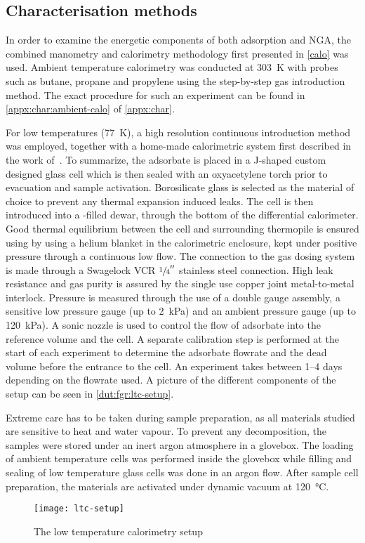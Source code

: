 \subsection{Characterisation methods}

In order to examine the energetic components of both adsorption and 
NGA, the combined manometry and calorimetry methodology first 
presented in \autoref{calo} was used. Ambient temperature calorimetry
was conducted at \SI{303}{\kelvin} with probes such as butane, propane
and propylene using the step-by-step gas introduction method. 
The exact procedure for such an experiment can be found in 
\autoref{appx:char:ambient-calo} of \autoref{appx:char}.

For low temperatures (\SI{77}{\kelvin}), a high resolution continuous
introduction method was employed, together with a home-made 
calorimetric system first described in the work 
of~\citet{rouquerolCalorimetricEvidenceBidimensional1977}. To summarize,
the adsorbate is placed in a J-shaped custom designed glass cell which is
then sealed with an oxyacetylene torch prior to evacuation and sample 
activation. Borosilicate glass is selected as
the material of choice to prevent any thermal expansion induced leaks.
The cell is then introduced into a -filled dewar, through 
the bottom of the differential calorimeter. Good thermal equilibrium
between the cell and surrounding thermopile is ensured using by 
using a helium blanket in the calorimetric enclosure, kept under 
positive pressure through a continuous low flow. The connection to the 
gas dosing system is made through a Swagelock VCR \(\sfrac{1}{4}''\)
stainless steel connection. High leak resistance and gas purity 
is assured by the single use copper joint metal-to-metal interlock.
Pressure is measured through the use of a double gauge assembly,
a sensitive low pressure gauge (up to \SI{2}{\kilo\pascal}) and 
an ambient pressure gauge (up to \SI{120}{\kilo\pascal}).
A sonic nozzle is used to control the flow of adsorbate into the 
reference volume and the cell. A separate calibration step is 
performed at the start of each experiment to determine the adsorbate
flowrate and the dead volume before the entrance to the cell.
An experiment takes between 1--4 days depending 
on the flowrate used. A picture of the different components of the 
setup can be seen in \autoref{dut:fgr:ltc-setup}.

Extreme care has to be taken during sample preparation, as all materials 
studied are sensitive to heat and water vapour. To prevent any 
decomposition, the samples were stored under an inert argon 
atmosphere in a glovebox. The loading of ambient temperature 
cells was performed inside the glovebox while filling and sealing 
of low temperature glass cells was done in an argon flow. After 
sample cell preparation, the materials are activated under 
dynamic vacuum at \SI{120}{\degreeCelsius}.

\begin{figure}[htb]
    \centering
    \texttt{[image: ltc-setup]}%
    \caption{The low temperature calorimetry setup}%
    \label{dut:fgr:ltc-setup}
\end{figure}